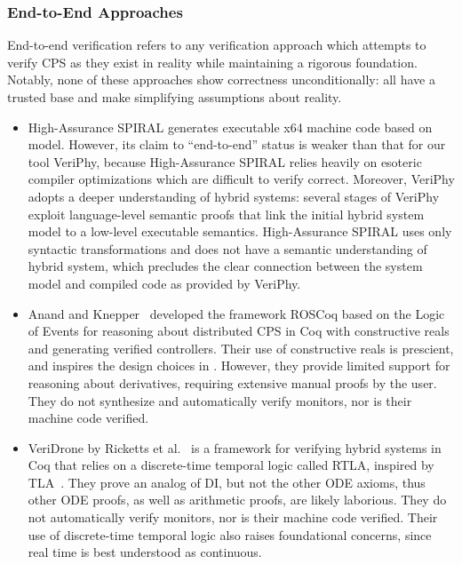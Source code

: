 \documentclass[12pt]{cmuthesis}
\theoremstyle{definition}
\theoremstyle{remark}
\newcommand{\rref}[2][]{\prettyref{#2}}
\newcommand{\VeriPhy}{VeriPhy\xspace}
\begin{document}
\subsubsection{End-to-End Approaches}
End-to-end verification refers to any verification approach which attempts to verify CPS as they exist in reality while maintaining a rigorous foundation.
Notably, none of these approaches show correctness unconditionally: all have a trusted base and make simplifying assumptions about reality.
\begin{itemize}
\item
  High-Assurance SPIRAL \cite{DBLP:journals/csm/FranchettiLMMGPPKMFJPV17} generates executable x64 machine code based on \dL model.
  However, its claim to ``end-to-end'' status is weaker than that for our tool \VeriPhy, because High-Assurance SPIRAL relies heavily on esoteric compiler optimizations which are difficult to verify correct.
  Moreover, \VeriPhy adopts a deeper understanding of hybrid systems: several stages of \VeriPhy exploit language-level semantic proofs that link the initial hybrid system model to a low-level executable semantics.
  High-Assurance SPIRAL uses only syntactic transformations and does not have a semantic understanding of hybrid system, which precludes the clear connection between the system model and compiled code as provided by \VeriPhy.
\item 
Anand and Knepper~\cite{Anand+Knepper:itp:2015} developed the framework ROSCoq based on the Logic of Events for reasoning about distributed CPS in Coq with constructive reals and generating verified controllers.
Their use of constructive reals is prescient, and inspires the design choices in \rref{ch:proofplex}.
However, they provide limited support for reasoning about derivatives, requiring extensive manual proofs by the user.
They do not synthesize and automatically verify monitors, nor is their machine code verified.
\item 
VeriDrone by Ricketts et al.~\cite{Ricketts:memcode:2015} is a framework for verifying hybrid systems in Coq that relies on a discrete-time temporal logic called RTLA, inspired by TLA~\cite{Lamport:hybrid:1992}.
They prove an analog of DI, but not the other ODE axioms, thus other ODE proofs, as well as arithmetic proofs, are likely laborious.
They do not automatically verify monitors, nor is their machine code verified.
Their use of discrete-time temporal logic also raises foundational concerns, since real time is best understood as continuous.
\end{itemize}
\end{document}
